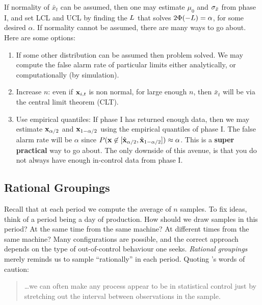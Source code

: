 \begin{extra}
If normality of $\bar{x}_t$ can be assumed, then one may estimate $\mu_0$ and $\sigma_{\bar{x}}$ from phase I, and set LCL and UCL by finding the $L$ that solves $2\Phi(-L)=\alpha$, for some desired $\alpha$. 
If normality cannot be assumed, there are many ways to go about. Here are some options:
\begin{enumerate}
\item If some other distribution can be assumed then problem solved.
We may compute the false alarm rate of particular limits either analytically, or computationally (by simulation).
\item Increase $n$: even if $\mathbf{x}_{i,t}$ is non normal, for large enough $n$, then $\bar{x}_t$ will be via the central limit theorem (CLT).
\item Use empirical quantiles: If phase I has returned enough data, then we may estimate 
$\mathbf{x}_{\alpha/2}$ and $\mathbf{x}_{1-\alpha/2}$ using the empirical quantiles of phase I. 
The false alarm rate will be $\alpha$ since $P(\mathbf{x} \not \in [\hat{\mathbf{x}}_{\alpha/2},\hat{\mathbf{x}}_{1-\alpha/2}]) \approx \alpha$.
This is a \textbf{super practical} way to go about. The only downside of this avenue, is that you do not always have enough in-control data from phase I.
\end{enumerate}

\end{extra}



\subsection{Rational Groupings}
\label{sec:rational_grouping}
Recall that at each period we compute the average of $n$ samples. 
To fix ideas, think of a period being a day of production. 
How should we draw samples in this period? 
At the same time from the same machine?
At different times from the same machine?
Many configurations are possible, and the correct approach depends on the type of out-of-control behaviour one seeks. 
\emph{Rational groupings} merely reminds us to sample ``rationally'' in each period. 
Quoting \cite{montgomery_introduction_2007}'s words of caution:
\begin{quotation}
\dots we can often make any process appear to be in statistical control just by stretching out the interval between observations in the sample.
\end{quotation}






